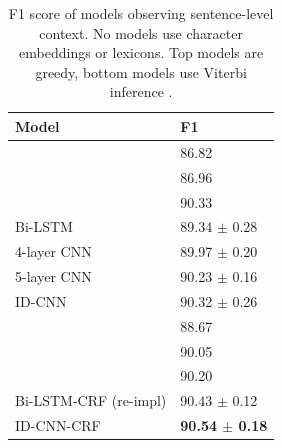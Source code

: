 \begin{table}
\begin{tabular}{ll}
    Model & F1 \\ \hline \hline
    \citet{ratinov2009design} & 86.82 \\ 
    \citet{collobert2011natural} & 86.96 \\ 
    \citet{lample2016neural} & 90.33 \\ \hline 
    Bi-LSTM & 89.34 $\pm$ 0.28 \\
    4-layer CNN & 89.97 $\pm$ 0.20 \\
    5-layer CNN & 90.23 $\pm$ 0.16 \\
    ID-CNN & 90.32 $\pm$ 0.26 \\ \hline\hline
    \citet{collobert2011natural} & 88.67 \\
    \citet{passos2014lexicon} & 90.05 \\
    \citet{lample2016neural} & 90.20 \\ \hline 
    Bi-LSTM-CRF (re-impl) & 90.43 $\pm$ 0.12 \\
    ID-CNN-CRF & {\bf 90.54 $\pm$ 0.18} \\
  \end{tabular}

  \caption{F1 score of models observing sentence-level context. No models use character embeddings or lexicons. Top models are greedy, bottom models use Viterbi inference \label{sentence-summary}.}
  
\end{table}
